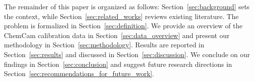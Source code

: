 The remainder of this paper is organized as follows:
Section~\ref{sec:background} sets the context, while Section~\ref{sec:related_works} reviews existing literature.
The problem is formalized in Section~\ref{sec:definition}.
We provide an overview of the ChemCam calibration data in Section~\ref{sec:data_overview} and present our methodology in Section~\ref{sec:methodology}.
Results are reported in Section~\ref{sec:results} and discussed in Section~\ref{sec:discussion}.
We conclude on our findings in Section~\ref{sec:conclusion} and suggest future research directions in Section~\ref{sec:recommendations_for_future_work}.
